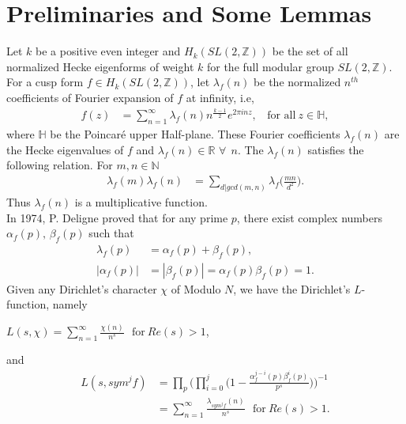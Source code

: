 \documentclass[preprint,12pt]{elsarticle}
\numberwithin{equation}{section}
\begin{document}
\section{Preliminaries and Some Lemmas}
Let $k$ be a positive even integer and $H_{k}(SL(2,\mathbb{Z}))$ be the set of all normalized Hecke eigenforms of weight $k$ for the full modular group $SL(2,\mathbb{Z})$. For a cusp form $f\in H_{k}(SL(2,\mathbb{Z}))$, let $\lambda_{f}(n)$ be the normalized $n^{th}$ coefficients of Fourier expansion of $f$ at infinity, i.e, 
\begin{align*}
	f(z)&=\sum_{n=1}^{\infty} \lambda_{f}(n)n^{\frac{k-1}{2}}e^{2\pi i nz},~~~~\text{for all}~z\in{\mathbb{H}},
\end{align*}
where $\mathbb{H}$ be the Poincar\'e upper Half-plane. These Fourier coefficients $\lambda_{f}(n)$ are the Hecke eigenvalues of $f$ and $\lambda_{f}(n)\in \mathbb{R}$ $\forall~~n.$ The $\lambda_{f}(n)$ satisfies the following relation. For $m,n\in \mathbb{N}$
\begin{align*}
	\lambda_{f}(m)\lambda_{f}(n)&=\sum\limits_{d|gcd(m,n)}\lambda_{f}\Big(\frac{mn}{d^{2}}\Big).
\end{align*}
Thus $\lambda_{f}(n)$ is a multiplicative function.\\
In 1974, P. Deligne \cite{PD} proved that for any prime $p$, there exist complex numbers $\alpha_{f}(p),\,\beta_{f}(p)$ such that
\begin{align*}
	\lambda_{f}(p)&=\alpha_{f}(p)+\beta_{f}(p),\\
	|\alpha_{f}(p)|&=|\beta_{f}(p)|=\alpha_{f}(p)\beta_{f}(p)=1.
\end{align*}
Given any Dirichlet's character $\chi$ of Modulo $N$, we have the Dirichlet's $L$-function, namely
\begin{center}
	$L(s,\chi)=\sum\limits_{n=1}^{\infty}\frac{\chi(n)}{n^{s}}~~~\text{for}~Re(s)>1$,
\end{center}
and
\begin{align*}
	L(s,sym^{j}f)&=\prod_{p}\Big(\prod\limits_{i=0}^{j}\Big(1-\frac{\alpha^{j-i}_{f}(p)\beta^{i}_{f}(p)}{p^{s}}\Big)\Big)^{-1}\\
	&=\sum_{n=1}^{\infty}\frac{\lambda_{sym^{j}f}(n)}{n^{s}}~~~\text{for}~Re(s)>1.
\end{align*}
\end{document}
